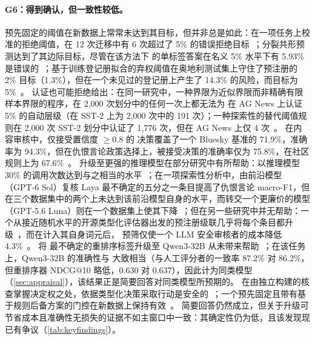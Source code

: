 \paragraph{G6：得到确认，但一致性较低。}
预先固定的阈值在新数据上常常未达到其目标，但并非总是如此：在一项任务上校准的拒绝阈值，在 12 次迁移中有 6 次超过了 5\% 的错误拒绝目标~\cite{arx03387}；分裂共形预测达到了其边际目标，尽管在该方法下 \jev{} 的单标签答案在名义 5\% 水平下有 5.93\% 是错误的~\cite{zen22935043}\zmark{}；基于训练登记册拟合的弃权阈值在奥地利测试集上守住了预注册的 2\% 目标（1.3\%），但在一个未见过的登记册上产生了 14.3\% 的风险，而目标为 5\%~\cite{zen23225893}\zmark{}。
认证也可能拒绝给出：在同一研究中，一种界限为近似界限而非精确有限样本界限的程序，在 2{,}000 次划分中的任何一次上都无法为 \jev{} 在 AG News 上认证 5\% 的自动层级（在 SST-2 上为 2{,}000 次中的 191 次）；一种探索性的替代阈值规则在 2{,}000 次 SST-2 划分中认证了 1{,}776 次，但在 AG News 上仅 4 次~\cite{zen22935043}\zmark{}。
在内容审核中，仅接受置信度 $\geq 0.8$ 的 \jev{} 决策覆盖了一个 Bluesky 基准的 71.9\%，准确率为 94.3\%，但在仇恨言论政策选择上，被接受决策的准确率仅为 75.8\%，在社区规则上为 67.6\%~\cite{arx07953}。
升级至更强的推理模型在部分研究中有所帮助：以推理模型 30\% 的调用次数达到与之相当的水平~\cite{arx09683}；在一项探索性分析中，由前沿模型（GPT-6 Sol）复核 Laya 最不确定的五分之一条目提高了仇恨言论 macro-F1，但在三个数据集中的两个上未达到该前沿模型自身的水平，而转交一个更廉价的模型（GPT-5.6 Luna）则在一个数据集上使其下降~\cite{arx03324}；但在另一些研究中并无帮助：一个从接近随机水平的开源类型化评估器出发的预注册级联几乎将每个条目都升级~\cite{arx07177}，而在计入其自身词元后，\jev{} 预筛仅使一个 LLM 安全审核者的成本降低 4.3\%~\cite{arx02267}。
将 \jev{} 最不确定的重排序标签升级至 Qwen3-32B 从未带来帮助~\cite{arx09188}；在该任务上，Qwen3-32B 的准确性与 \jev{} 大致相当（与人工评分者的一致率 87.2\% 对 86.2\%，但重排序器 NDCG@10 略低，0.630 对 0.637），因此计为同类模型（\cref{sec:appraisal}），该结果正是简要回答对同类模型所预期的。
在由独立构建的核查掌握决定权之处，依据类型化决策采取行动是安全的~\cite{arx07327}；一个预先固定且带有基于规则后备方案的门控在新数据上保持有效~\cite{zen23088660}\zmark{}。
简要回答仍然成立，但关于升级可节省成本且准确性无损失的证据不如主窗口中一致：其确定性仍为低，且该发现现已有争议（\cref{tab:keyfindings}）。

